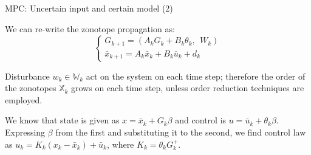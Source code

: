 \documentclass{beamer}
\begin{document}
\begin{frame}{MPC: Uncertain input and certain model (2)}
	\begin{flushleft}
		
		We can re-write the zonotope propagation as:
		\begin{equation}
			\begin{cases}
				G_{k+1}  = (A_k G_k + B_k \theta_k, \ \ W_k)
				\\
				\bar{x}_{k+1}  = A_k \bar{x}_k + B_k \bar{u}_k + d_k
			\end{cases}
		\end{equation}
		
		Disturbance $w_k \in \mathbb{W}_k$ act on the system on each time step; therefore the order of the zonotopes $\mathbb{X}_k$ grows on each time step, unless order reduction techniques are employed. 
		
		\bigskip
		
		We know that state is given as $x = \bar{x}_k + G_k \beta$ and control is $u = \bar{u}_k + \theta_k \beta$. Expressing $\beta$ from the first and substituting it to the second, we find control law as $u_k = K_k (x_k - \bar{x}_k) + \bar{u}_k$, where $K_k = \theta_k G_k^+$.
		
	\end{flushleft}
\end{frame}



\myqrframe
\end{document}

